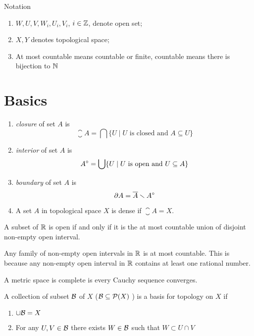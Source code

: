 \documentclass[twocolumn]{article}
\begin{document}
\begin{fdefi}{Notation}{}
	\begin{enumerate}
		\item $W, U, V, W_i, U_i, V_i$, $i \in \mathbb{Z}$, denote open set;
		\item $X, Y$ denotes topological space;
		\item At most countable means countable or finite, countable means there is bijection to $\mathbb{N}$
	\end{enumerate}
\end{fdefi}
\hrulefill

\section{Basics}

\begin{defi}
	\begin{enumerate}
		\item \emph{closure} of set $A$ is 
			$$
				\closure{A} = \bigcap \{ U \mid U \text{ is closed and } A \subseteq U \}
			$$
		\item \emph{interior} of set $A$ is 
			$$
				A^{\circ} = \bigcup \{ U \mid U \text{ is open and } U \subseteq A \}
			$$
		\item \emph{boundary} of set $A$ is 
			$$
			\partial A = \overline{A} \smallsetminus A^{\circ} 
			$$
		\item A set $A$ in topological space $X$ is dense if $\closure{A} = X$.
	\end{enumerate}
\end{defi}

\begin{thm}
	A subset of $\mathbb{R}$ is open if and only if it is the at most countable union of disjoint non-empty open interval.
\end{thm}

\begin{remark}
	Any family of non-empty open intervals in $\mathbb{R}$ is at most countable. 
	This is because any non-empty open interval in $\mathbb{R}$ contains at least one rational number.
\end{remark}

\begin{defi}
	A metric space is complete is every Cauchy sequence converges.
\end{defi}

\begin{defi}
	A collection of subset $\mathcal{B}$ of $X$ ($\mathcal{B} \subseteq \mathcal{P}(X)$ ) is a basis for topology on $X$ if 
	\begin{enumerate}
		\item $\cup \mathcal{B} = X$
		\item For any $U, V \in \mathcal{B}$ there exists $W \in \mathcal{B}$ such that $W \subset  U \cap V$
	\end{enumerate}
\end{defi}
\end{document}
